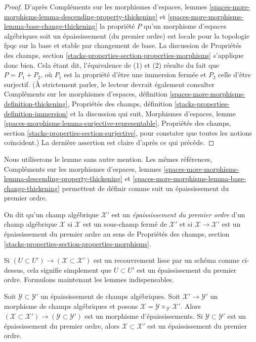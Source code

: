 \begin{proof}
D'après Compléments sur les morphismes d'espaces, lemmes
\ref{spaces-more-morphisms-lemma-descending-property-thickening} et
\ref{spaces-more-morphisms-lemma-base-change-thickening}
la propriété $P$ qu'un morphisme d'espaces algébriques soit un
épaississement (du premier ordre) est locale pour la topologie fpqc sur la base et stable par
changement de base. La discussion de Propriétés des champs, section
\ref{stacks-properties-section-properties-morphisms} s'applique donc bien.
Cela étant dit, l'équivalence de (1) et (2) résulte du
fait que $P = P_1 + P_2$, où $P_1$ est la propriété d'être
une immersion fermée et $P_2$ celle d'être surjectif.
(À strictement parler, le lecteur devrait également consulter
Compléments sur les morphismes d'espaces, définition
\ref{spaces-more-morphisms-definition-thickening},
Propriétés des champs, définition \ref{stacks-properties-definition-immersion}
et la discussion qui suit, Morphismes d'espaces, lemme
\ref{spaces-morphisms-lemma-surjective-representable},
Propriétés des champs, section \ref{stacks-properties-section-surjective},
pour constater que toutes les notions coïncident.)
La dernière assertion est claire d'après ce qui précède.
\end{proof}

\noindent
Nous utiliserons le lemme sans autre mention. Les mêmes références,
Compléments sur les morphismes d'espaces, lemmes
\ref{spaces-more-morphisms-lemma-descending-property-thickening} et
\ref{spaces-more-morphisms-lemma-base-change-thickening}
permettent de définir comme suit un épaississement du premier ordre.

\begin{definition}
\label{definition-first-order-thickening}
On dit qu'un champ algébrique $\mathcal{X}'$ est un {\it épaississement du premier ordre}
d'un champ algébrique $\mathcal{X}$ si $\mathcal{X}$ est un sous-champ fermé
de $\mathcal{X}'$ et si $\mathcal{X} \to \mathcal{X}'$ est un épaississement
du premier ordre au sens de Propriétés des champs, section
\ref{stacks-properties-section-properties-morphisms}.
\end{definition}

\noindent
Si $(U \subset U') \to (\mathcal{X} \subset \mathcal{X}')$ est un
recouvrement lisse par un schéma comme ci-dessus, cela signifie simplement que $U \subset U'$
est un épaississement du premier ordre. Formulons maintenant les lemmes indispensables.

\begin{lemma}
\label{lemma-base-change-thickening}
Soit $\mathcal{Y} \subset \mathcal{Y}'$ un épaississement de champs algébriques.
Soit $\mathcal{X}' \to \mathcal{Y}'$ un morphisme de champs algébriques
et posons $\mathcal{X} = \mathcal{Y} \times_{\mathcal{Y}'} \mathcal{X}'$.
Alors
$(\mathcal{X} \subset \mathcal{X}') \to (\mathcal{Y} \subset \mathcal{Y}')$
est un morphisme d'épaississements. Si $\mathcal{Y} \subset \mathcal{Y}'$ est un
épaississement du premier ordre, alors $\mathcal{X} \subset \mathcal{X}'$ est un
épaississement du premier ordre.
\end{lemma}

